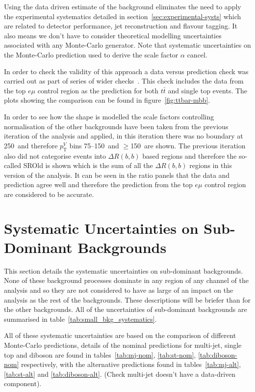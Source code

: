 Using the data driven estimate of the background eliminates the need to apply
the experimental systematics detailed in section~\ref{sec:experimental-systs}
which are related to detector performance, jet reconstruction and flavour
tagging. It also means we don't have to consider theoretical modelling
uncertainties associated with any Monte-Carlo generator. Note that systematic
uncertainties on the Monte-Carlo prediction used to derive the scale factor
$\alpha$ cancel.

In order to check the validity of this approach a data versus prediction check
was carried out as part of series of wider checks~\cite{VHModellingNote2019}.
This check includes the data from the top $e\mu$ control region as the
prediction for both $t\bar{t}$ and single top events. The plots showing the
comparison can be found in figure~\ref{fig:ttbar-mbb}.

In order to see how the shape is modelled the scale factors controlling
normalisation of the other backgrounds have been taken from the previous
iteration of the analysis and applied, in this iteration there was no boundary
at 250~\GeV and therefore $p_{\mathrm{T}}^V$ bins 75--150~\GeV and $\geq$150~\GeV are
shown. The previous iteration also did not categorise events into $\Delta R(b,
b)$ based regions and therefore the so-called SROld is shown which is the sum of
all the $\Delta R(b, b)$ regions in this version of the analysis. It can be seen
in the ratio panels that the data and prediction agree well and therefore the
prediction from the top $e\mu$ control region are considered to be accurate.

\clearpage
\newpage

\section{Systematic Uncertainties on Sub-Dominant Backgrounds}

This section details the systematic uncertainties on sub-dominant backgrounds.
None of these background processes dominate in any region of any channel of the
analysis and so they are not considered to have as large of an impact on the
analysis as the rest of the backgrounds. These descriptions will be briefer than
for the other backgrounds. All of the uncertainties of sub-dominant backgrounds
are summarised in table~\ref{tab:small_bkg_systematics}.

All of these systematic uncertainties are based on the comparison of different
Monte-Carlo predictions, details of the nominal predictions for multi-jet,
single top and diboson are found in tables~\ref{tab:mj-nom}, \ref{tab:st-nom},
\ref{tab:diboson-nom} respectively, with the alternative predictions found in
tables~\ref{tab:mj-alt}, \ref{tab:st-alt} and \ref{tab:diboson-alt}. (Check
multi-jet doesn't have a data-driven component).


